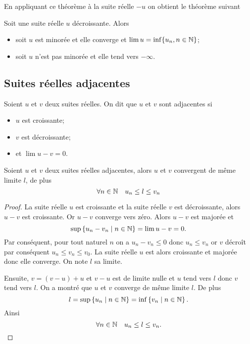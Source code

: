 En appliquant ce théorème à la suite réelle $-u$ on obtient le théorème suivant
\begin{theo}
  Soit une suite réelle $u$ décroissante. Alors
  \begin{itemize}
  \item soit $u$ est minorée et elle converge et $\lim u = \inf\{u_n, n \in \mathbb{N}\}$;
  \item soit $u$ n'est pas minorée et elle tend vers $-\infty$.
  \end{itemize}
\end{theo}

\subsection{Suites réelles adjacentes}

\begin{defdef}
  Soient $u$ et $v$ deux suites réelles. On dit que $u$ et $v$ sont adjacentes si
  \begin{itemize}
  \item $u$ est croissante;
  \item $v$ est décroissante;
  \item et $\lim u-v =0$.
  \end{itemize}
\end{defdef}
\begin{prop}
  Soient $u$ et $v$ deux suites réelles adjacentes, alors $u$ et $v$ convergent de même limite $l$, de plus
  \begin{equation}
    \forall n \in \mathbb{N} \quad u_n \leq l \leq v_n
  \end{equation}
\end{prop}
\begin{proof}
  La suite réelle $u$ est croissante et la suite réelle $v$ est décroissante, alors $u-v$ est croissante. Or $u-v$ converge vers zéro. Alors $u-v$ est majorée et
  \begin{equation}
    \sup\left\{u_n-v_n\mathrel{}\middle|\mathrel{}n \in \mathbb{N}\right\}=\lim u-v=0.
  \end{equation}
Par conséquent, pour tout naturel $n$ on a $u_n-v_n \leq 0$ donc $u_n \leq v_n$ or $v$ décroît par conséquent $u_n \leq v_n \leq v_0$. La suite réelle $u$ est alors croissante et majorée donc elle converge. On note $l$ sa limite. 

Ensuite, $v=(v-u)+u$ et $v-u$ est de limite nulle et $u$ tend vers $l$ donc $v$ tend vers $l$. On a montré que $u$ et $v$ converge de même limite $l$. De plus
\begin{equation}
  l=\sup\left\{u_n\mathrel{}\middle|\mathrel{}n\in \mathbb{N}\right\}=\inf\left\{v_n\mathrel{}\middle|\mathrel{}n\in \mathbb{N}\right\}.
\end{equation}
Ainsi
\begin{equation}
  \forall n \in \mathbb{N} \quad u_n \leq l \leq v_n.
\end{equation}
\end{proof}

